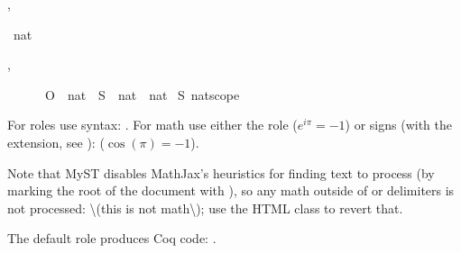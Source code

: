 \documentclass[letterpaper,10pt,english]{sphinxmanual}
\begin{document}
\begin{alectryon}
  \sep
  \begin{sentence}
    \begin{input}
      ~nat
    \end{input}
    \sep
    \begin{output}
      \begin{messages}
        \begin{message}
          ~~~~~~O~~nat~~S~~nat~~nat\nl
          \nl
          ~S~\PYGZus{}nat\PYGZus{}scope
        \end{message}
      \end{messages}
    \end{output}
  \end{sentence}
\end{alectryon}

\sphinxAtStartPar
For roles use  syntax: .  For math use either the  role (\(e^{i\pi} = -1\)) or \sphinxcode{\sphinxupquote{\$}} signs (with the  extension, see ): (\(\cos(\pi) = -1\)).

\sphinxAtStartPar
Note that MyST disables MathJax’s heuristics for finding text to process (by marking the root of the document with ), so any math outside of  or \sphinxcode{\sphinxupquote{\$}} delimiters is not processed: \textbackslash{}(this is not math\textbackslash{}); use the  HTML class to revert that.

\sphinxAtStartPar
The default role produces Coq code: .
\end{document}
